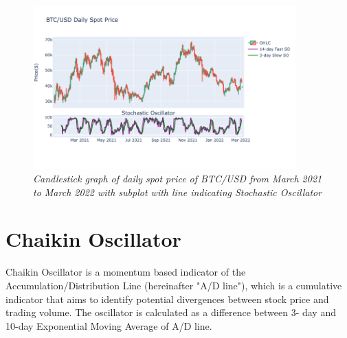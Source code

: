 \begin{figure}[h]

\begin{center}
	\includegraphics[width=0.9\textwidth]{Stochastic.png}
\end{center}

\caption{\textit{ Candlestick graph of daily spot price of BTC/USD from March 2021 to March 2022 with subplot with line indicating Stochastic Oscillator}}

\end{figure}

\newpage

\section{Chaikin Oscillator}

Chaikin Oscillator is a momentum based indicator of the Accumulation/Distribution Line (hereinafter "A/D line"), which is a cumulative indicator that aims to identify potential divergences between stock price and trading volume. The oscillator is calculated as a difference between 3- day and 10-day Exponential Moving Average of A/D line. 

\vspace{0.5cm}

